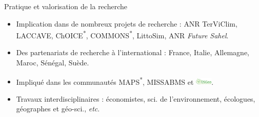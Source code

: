 \documentclass[newPxFont]{beamer}
\begin{document}

\begin{frame}{Pratique et valorisation de la recherche}
\vspace{-2em}
\begin{itemize}
  \item Implication dans de nombreux projets de recherche : \alert{\color{sthlmBlue}ANR TerViClim}, LACCAVE, ChOICE\textsuperscript{*}, \alert{\color{sthlmBlue}COMMONS}\textsuperscript{*}, LittoSim, \alert{\color{sthlmBlue}ANR \textit{Future Sahel}}.
	\item Des partenariats de recherche à l'international : France, Italie, Allemagne, Maroc, Sénégal, Suède.
	\item Impliqué dans les communautés MAPS\textsuperscript{*}, MISSABMS et \includegraphics[width=0.8cm]{img/Logo_OSGeo}.
	\item Travaux interdisciplinaires : économistes, sci. de l'environnement, écologues, géographes et géo-sci., \textit{etc}.
\end{itemize}
\vspace{-2em}
\begin{figure}
 	\centering
\end{figure}
\end{frame}

%
%
\end{document}

